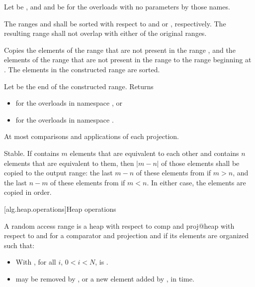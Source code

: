 \begin{itemdescr}
\pnum
Let  be ,
and  and  be 
for the overloads with no parameters by those names.

\pnum
\requires
The ranges  and  shall be sorted
with respect to  and  or , respectively.
The resulting range shall not overlap with either of the original ranges.

\pnum
\effects
Copies the elements of the range 
that are not present in the range ,
and the elements of the range 
that are not present in the range 
to the range beginning at .
The elements in the constructed range are sorted.

\pnum
\returns
Let  be the end of the constructed range.
Returns
\begin{itemize}
\item
  for the overloads in namespace , or
\item
  for the overloads in namespace .
\end{itemize}

\pnum
\complexity
At most 
comparisons and applications of each projection.

\pnum
\remarks
Stable.
If  contains $m$ elements
that are equivalent to each other and
 contains $n$ elements
that are equivalent to them,
then $|m - n|$ of those elements shall be copied to the output range:
the last $m - n$ of these elements from  if $m > n$, and
the last $n - m$ of these elements from  if $m < n$.
In either case, the elements are copied in order.
\end{itemdescr}

[alg.heap.operations]{Heap operations}

\pnum
A random access range  is a
{heap with respect to comp and proj@heap with respect to  and }
for a comparator and projection  and 
if its elements are organized such that:

\begin{itemize}
\item
  With , for all $i$, $0 < i < N$,
  is .
\item
   may be removed by , or
  a new element added by ,
  in  time.
\end{itemize}


